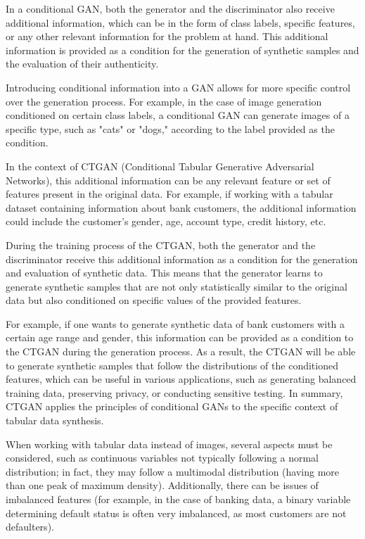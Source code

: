 In a conditional GAN, both the generator and the discriminator also receive additional information, which can be in the form of class labels, specific features, or any other relevant information for the problem at hand. This additional information is provided as a condition for the generation of synthetic samples and the evaluation of their authenticity.

Introducing conditional information into a GAN allows for more specific control over the generation process. For example, in the case of image generation conditioned on certain class labels, a conditional GAN can generate images of a specific type, such as "cats" or "dogs," according to the label provided as the condition.

In the context of CTGAN (Conditional Tabular Generative Adversarial Networks), this additional information can be any relevant feature or set of features present in the original data. For example, if working with a tabular dataset containing information about bank customers, the additional information could include the customer's gender, age, account type, credit history, etc.

During the training process of the CTGAN, both the generator and the discriminator receive this additional information as a condition for the generation and evaluation of synthetic data. This means that the generator learns to generate synthetic samples that are not only statistically similar to the original data but also conditioned on specific values of the provided features.

For example, if one wants to generate synthetic data of bank customers with a certain age range and gender, this information can be provided as a condition to the CTGAN during the generation process. As a result, the CTGAN will be able to generate synthetic samples that follow the distributions of the conditioned features, which can be useful in various applications, such as generating balanced training data, preserving privacy, or conducting sensitive testing. In summary, CTGAN applies the principles of conditional GANs to the specific context of tabular data synthesis.

When working with tabular data instead of images, several aspects must be considered, such as continuous variables not typically following a normal distribution; in fact, they may follow a multimodal distribution (having more than one peak of maximum density). Additionally, there can be issues of imbalanced features (for example, in the case of banking data, a binary variable determining default status is often very imbalanced, as most customers are not defaulters).

